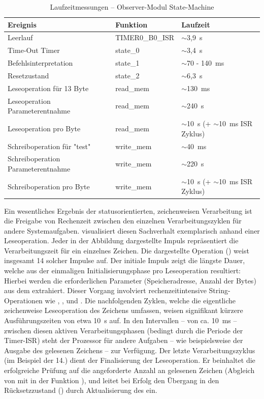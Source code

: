 \begin{table}[h!]
	\small
	\centering
	\begin{tabular}{|l|l|l|}
		\hline
		\textbf{Ereignis} & \textbf{Funktion} & \textbf{Laufzeit} \\\hline
		Leerlauf & TIMER0\_B0\_ISR & $\sim$3{,}9~\textmu s \\
		Time-Out Timer & state\_0 & $\sim$3{,}4~\textmu s \\
		Befehlsinterpretation & state\_1 & $\sim$70 - 140~ms \\
		Resetzustand & state\_2 & $\sim$6{,}3~\textmu s \\
		Leseoperation f\"ur 13 Byte & read\_mem & $\sim$130~ms \\
		Leseoperation Parameterentnahme & read\_mem & $\sim$240~\textmu s \\
		Leseoperation pro Byte & read\_mem & $\sim$10~\textmu s (+ $\sim$10~ms ISR Zyklus) \\
		Schreiboperation f\"ur "test" & write\_mem & $\sim$40~ms \\
		Schreiboperation Parameterentnahme & write\_mem & $\sim$220~\textmu s \\
		Schreiboperation pro Byte & write\_mem & $\sim$10~\textmu s (+ $\sim$10~ms ISR Zyklus) \\\hline
	\end{tabular}
	\caption{Laufzeitmessungen -- Observer-Modul State-Machine}
	\label{tab:laufzeitmessungen}
\end{table}

Ein wesentliches Ergebnis der statusorientierten, zeichenweisen Verarbeitung ist die Freigabe von Rechenzeit zwischen den einzelnen Verarbeitungszyklen f\"ur andere Systemaufgaben.  visualisiert diesen Sachverhalt exemplarisch anhand einer Leseoperation. Jeder in der Abbildung dargestellte Impuls repr\"asentiert die Verarbeitungszeit f\"ur ein einzelnes Zeichen. Die dargestellte Operation () weist insgesamt 14 solcher Impulse auf. Der initiale Impuls zeigt die l\"angste Dauer, welche aus der einmaligen Initialisierungsphase pro Leseoperation resultiert: Hierbei werden die erforderlichen Parameter (Speicheradresse, Anzahl der Bytes) aus dem  extrahiert. Dieser Vorgang involviert rechenzeitintensive String-Operationen wie , ,  und . Die nachfolgenden Zyklen, welche die eigentliche zeichenweise Leseoperation des Zeichens umfassen, weisen signifikant k\"urzere Ausf\"uhrungszeiten von etwa 10~\textmu s auf. In den Intervallen -- von ca. 10~ms -- zwischen diesen aktiven Verarbeitungsphasen (bedingt durch die Periode der Timer-ISR) steht der Prozessor f\"ur andere Aufgaben -- wie beispielsweise der Ausgabe des gelesenen Zeichens -- zur Verf\"ugung. Der letzte Verarbeitungszyklus (im Beispiel der 14.) dient der Finalisierung der Leseoperation. Er beinhaltet die erfolgreiche Pr\"ufung auf die angeforderte Anzahl an gelesenen Zeichen (Abgleich von  mit  in der Funktion ), und leitet bei Erfolg den \"Ubergang in den R\"ucksetzzustand () durch Aktualisierung des  ein.

